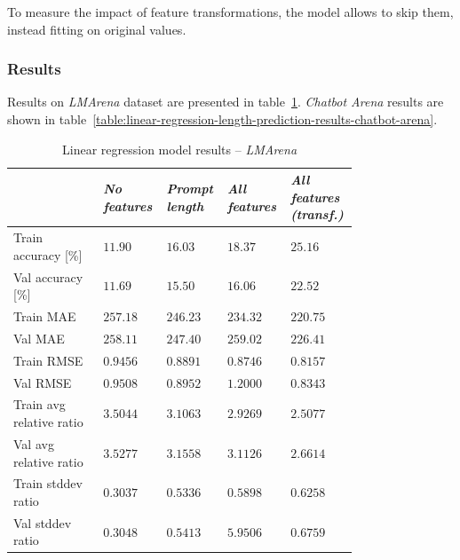 \documentclass[a4paper,11pt,twoside]{report}
\theoremstyle{definition}
\begin{document}
To measure the impact of feature transformations, the model allows to skip them, instead fitting on original values.

\subsubsection{Results}

Results on \textit{LMArena} dataset are presented in table~\ref{table:linear-regression-length-prediction-results-lmarena}. \textit{Chatbot Arena} results are shown in table~\ref{table:linear-regression-length-prediction-results-chatbot-arena}.

\begin{table}[h]
    \centering
    \caption{Linear regression model results -- \textit{LMArena}}
    \begin{tabular}{
    >{\raggedright\arraybackslash}p{0.25\linewidth}
    >{\centering\arraybackslash}p{0.13\linewidth}
    >{\centering\arraybackslash}p{0.13\linewidth}
    >{\centering\arraybackslash}p{0.13\linewidth}
    >{\centering\arraybackslash}p{0.13\linewidth}
    }
        \toprule
        & \textit{No features} & \textit{Prompt length} & \textit{All features} & \textit{All features (transf.)} \\
        \midrule
        Train accuracy [\%]      & $11.90$ & $16.03$ & $18.37$ & $25.16$ \\
        Val accuracy [\%]        & $11.69$ & $15.50$ & $16.06$ & $22.52$ \\
        Train MAE                & $257.18$ & $246.23$ & $234.32$ & $220.75$ \\
        Val MAE                  & $258.11$ & $247.40$ & $259.02$ & $226.41$ \\
        Train RMSE               & $0.9456$ & $0.8891$ & $0.8746$ & $0.8157$ \\
        Val RMSE                 & $0.9508$ & $0.8952$ & $1.2000$ & $0.8343$ \\
        Train avg relative ratio & $3.5044$ & $3.1063$ & $2.9269$ & $2.5077$ \\
        Val avg relative ratio   & $3.5277$ & $3.1558$ & $3.1126$ & $2.6614$ \\
        Train stddev ratio       & $0.3037$ & $0.5336$ & $0.5898$ & $0.6258$ \\
        Val stddev ratio         & $0.3048$ & $0.5413$ & $5.9506$ & $0.6759$ \\
        \bottomrule
    \end{tabular}
    \label{table:linear-regression-length-prediction-results-lmarena}
\end{table}
\end{document}
